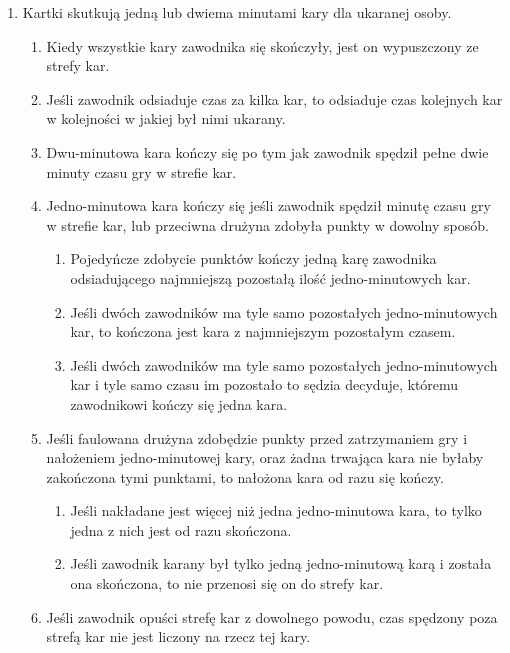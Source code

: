 \documentclass[11pt,a4paper]{article}
\begin{document}
\begin{enumerate}

\item
  Kartki skutkują jedną lub dwiema minutami kary dla ukaranej osoby.

  \begin{enumerate}
  
  \item
    Kiedy wszystkie kary zawodnika się skończyły, jest on wypuszczony ze
    strefy kar.
  \item
    Jeśli zawodnik odsiaduje czas za kilka kar, to odsiaduje czas
    kolejnych kar w kolejności w jakiej był nimi ukarany.
  \item
    Dwu-minutowa kara kończy się po tym jak zawodnik spędził pełne dwie
    minuty czasu gry w strefie kar.
  \item
    Jedno-minutowa kara kończy się jeśli zawodnik spędził minutę czasu
    gry w strefie kar, lub przeciwna drużyna zdobyła punkty w dowolny
    sposób.

    \begin{enumerate}
    
    \item
      Pojedyńcze zdobycie punktów kończy jedną karę zawodnika
      odsiadującego najmniejszą pozostałą ilość jedno-minutowych kar.
    \item
      Jeśli dwóch zawodników ma tyle samo pozostałych jedno-minutowych
      kar, to kończona jest kara z najmniejszym pozostałym czasem.
    \item
      Jeśli dwóch zawodników ma tyle samo pozostałych jedno-minutowych
      kar i tyle samo czasu im pozostało to sędzia decyduje, któremu
      zawodnikowi kończy się jedna kara.
    \end{enumerate}
  \item
    Jeśli faulowana drużyna zdobędzie punkty przed zatrzymaniem gry i
    nałożeniem jedno-minutowej kary, oraz żadna trwająca kara nie byłaby
    zakończona tymi punktami, to nałożona kara od razu się kończy.

    \begin{enumerate}
    
    \item
      Jeśli nakładane jest więcej niż jedna jedno-minutowa kara, to
      tylko jedna z nich jest od razu skończona.
    \item
      Jeśli zawodnik karany był tylko jedną jedno-minutową karą i
      została ona skończona, to nie przenosi się on do strefy kar.
    \end{enumerate}
  \item
    Jeśli zawodnik opuści strefę kar z dowolnego powodu, czas spędzony
    poza strefą kar nie jest liczony na rzecz tej kary.


\end{enumerate}
\end{enumerate}
\end{document}
